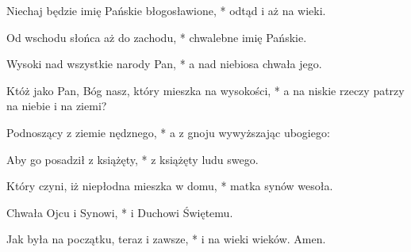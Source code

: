 ﻿\item {} Niechaj będzie imię Pańskie błogosławione, * odtąd i aż na wieki.
\item Od wschodu słońca aż do zachodu, * chwalebne imię Pańskie.
\item Wysoki nad wszystkie narody Pan, * a nad niebiosa chwała jego.
\item Któż jako Pan, Bóg nasz, który mieszka na wysokości, * a na niskie rzeczy patrzy na niebie i na ziemi?
\item Podnoszący z ziemie nędznego, * a z gnoju wywyższając ubogiego:
\item Aby go posadził z książęty, * z książęty ludu swego.
\item Który czyni, iż niepłodna mieszka w domu, * matka synów wesoła.
\item Chwała Ojcu i Synowi, * i Duchowi Świętemu.
\item Jak była na początku, teraz i zawsze, * i na wieki wieków. Amen.